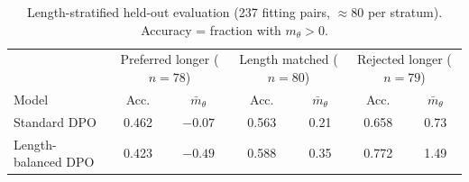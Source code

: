 \documentclass{article}
\begin{document}
\begin{table}[t]
\centering\footnotesize
\caption{DPO summary. Loss is evaluated at each run's own $\beta$ and is therefore not comparable across rows; the $\beta$-free margin $m_\theta$ and accuracy are. The standard and length-balanced runs use a 2.4$\times$ larger budget than the $\beta$ forks. 51\% of generations hit the 256-token cap, so length statistics are censored.}
\label{tab:dpo}
\end{table}

\begin{table}[t]
\centering\footnotesize
\caption{Length-stratified held-out evaluation (237 fitting pairs, $\approx$80 per stratum). Accuracy = fraction with $m_\theta>0$.}
\label{tab:strata}
\begin{tabular}{lcccccc}
\toprule
& \multicolumn{2}{c}{Preferred longer ($n{=}78$)} & \multicolumn{2}{c}{Length matched ($n{=}80$)} & \multicolumn{2}{c}{Rejected longer ($n{=}79$)}\\
\cmidrule(lr){2-3}\cmidrule(lr){4-5}\cmidrule(lr){6-7}
Model & Acc. & $\bar m_\theta$ & Acc. & $\bar m_\theta$ & Acc. & $\bar m_\theta$ \\
\midrule
Standard DPO & 0.462 & $-0.07$ & 0.563 & 0.21 & 0.658 & 0.73 \\
Length-balanced DPO & 0.423 & $-0.49$ & 0.588 & 0.35 & 0.772 & 1.49 \\
\bottomrule
\end{tabular}
\end{table}
\end{document}
